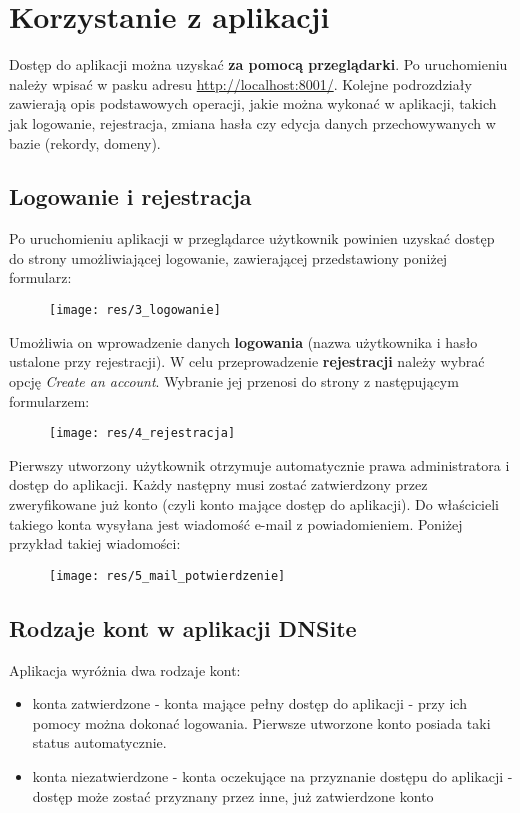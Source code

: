 \documentclass[12pt] {article}
\begin{document}
\section{Korzystanie z aplikacji}
\label{webapp}
Dostęp do aplikacji można uzyskać \textbf{za pomocą przeglądarki}. Po uruchomieniu należy wpisać w pasku adresu \url{http://localhost:8001/}. \newline
Kolejne podrozdziały zawierają opis podstawowych operacji, jakie można wykonać w aplikacji, takich jak logowanie, rejestracja, zmiana hasła czy edycja danych przechowywanych w bazie (rekordy, domeny).

\subsection{Logowanie i rejestracja}
Po uruchomieniu aplikacji w przeglądarce użytkownik powinien uzyskać dostęp do strony umożliwiającej logowanie, zawierającej przedstawiony poniżej formularz:
\begin{figure}[H]
\centering
\texttt{[image: res/3\_logowanie]}
\end{figure}
Umożliwia on wprowadzenie danych \textbf{logowania} (nazwa użytkownika i hasło ustalone przy rejestracji). W celu przeprowadzenie \textbf{rejestracji} należy wybrać opcję \emph{Create an account}. Wybranie jej przenosi do strony z następującym formularzem:
\begin{figure}[H]
\centering
\texttt{[image: res/4\_rejestracja]}
\end{figure}
Pierwszy utworzony użytkownik otrzymuje automatycznie prawa administratora i dostęp do aplikacji. Każdy następny musi zostać zatwierdzony przez zweryfikowane już konto (czyli konto mające dostęp do aplikacji). Do właścicieli takiego konta wysyłana jest wiadomość e-mail z powiadomieniem. Poniżej przykład takiej wiadomości:
\begin{figure}[H]
\centering
\texttt{[image: res/5\_mail\_potwierdzenie]}
\end{figure}

\subsection{Rodzaje kont w aplikacji DNSite}
Aplikacja wyróżnia dwa rodzaje kont:
\begin{itemize}
\item konta zatwierdzone - konta mające pełny dostęp do aplikacji - przy ich pomocy można dokonać logowania. Pierwsze utworzone konto posiada taki status automatycznie.
\item konta niezatwierdzone - konta oczekujące na przyznanie dostępu do aplikacji - dostęp może zostać przyznany przez inne, już zatwierdzone konto
\end{itemize}
\end{document}
